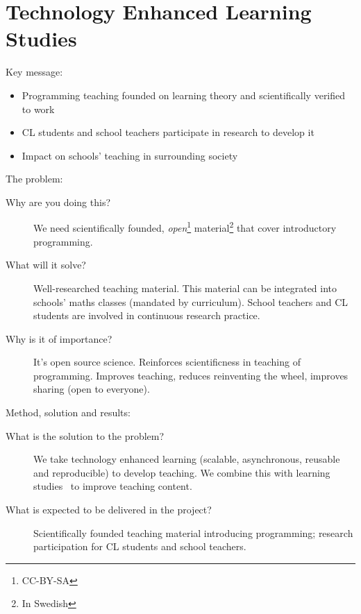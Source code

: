 \mode*

\section{Technology Enhanced Learning Studies}

Key message:
\begin{itemize}
  \item Programming teaching founded on learning theory and scientifically 
    verified to work

  \item CL students and school teachers participate in research to develop it

  \item Impact on schools' teaching in surrounding society
\end{itemize}

The problem:
\begin{description}
  \item[Why are you doing this?]
    We need scientifically founded, \emph{open}\footnote{CC-BY-SA} 
    material\footnote{In Swedish} that cover introductory programming.

  \item[What will it solve?]
    Well-researched teaching material.
    This material can be integrated into schools’ maths classes (mandated by 
    curriculum).
    School teachers and CL students are involved in continuous research 
    practice.

  \item[Why is it of importance?]
    It's open source science.
    Reinforces scientificness in teaching of programming.
    Improves teaching, reduces reinventing the wheel, improves sharing (open to 
    everyone).
\end{description}

Method, solution and results:
\begin{description}
  \item[What is the solution to the problem?]
    We take technology enhanced learning (scalable, asynchronous, reusable and 
    reproducible) to develop teaching.
    We combine this with learning studies~\cite{LearningStudy} to improve 
    teaching content.

  \item[What is expected to be delivered in the project?]
    Scientifically founded teaching material introducing programming;
    research participation for CL students and school teachers.
\end{description}

